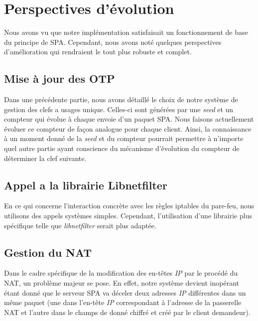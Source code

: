 \chapter{Perspectives d'évolution}

Nous avons vu que notre implémentation satisfaisait un fonctionnement de base du principe de SPA.
Cependant, nous avons noté quelques perspectives d'amélioration qui rendraient le tout plus robuste et complet.

\section{Mise à jour des OTP}
Dans une précédente partie, nous avons détaillé le choix de notre système de gestion des clefs a usages unique. 
Celles-ci sont générées par une \emph{seed} et un compteur qui évolue à chaque envoie d'un paquet SPA.
Nous faisons actuellement évoluer ce compteur de façon analogue pour chaque client.
Ainsi, la connaissance à un moment donné de la \emph{seed} et du compteur pourrait permettre à n'importe quel autre partie ayant conscience du mécanisme d'évolution du compteur de déterminer la clef suivante.

\section{Appel a la librairie Libnetfilter}
En ce qui concerne l'interaction concrète avec les règles iptables du pare-feu, nous utilisons des appels systèmes simples. Cependant, l'utilisation d'une librairie plus spécifique telle que \emph{libnetfilter} serait plus adaptée.

\section{Gestion du NAT}
Dans le cadre spécifique de la modification des en-têtes \emph{IP} par le procédé du NAT, un problème majeur se pose.
En effet, notre système devient inopérant étant donné que le serveur SPA va déceler deux adresses \emph{IP} différentes dans un même paquet (une dans l'en-tête \emph{IP} correspondant à l'adresse de la passerelle NAT et l'autre dans le champs de donné chiffré et créé par le client demandeur).